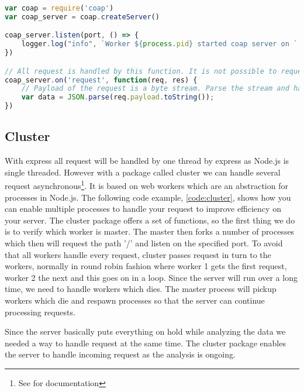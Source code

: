 \documentclass[USenglish]{ifimaster}  %
\begin{document}
\begin{lstlisting}[caption={Base \acrshort{coap} setup},label={code:coap},language=JavaScript]
var coap = require('coap')
var coap_server = coap.createServer()

coap_server.listen(port, () => {
    logger.log("info", `Worker ${process.pid} started coap server on ` + port);
})

// All request is handled by this function. It is not possible to request a specific url path
coap_server.on('request', function(req, res) {
    // Payload of the request is a byte stream. Parse the stream and handle the data
    var data = JSON.parse(req.payload.toString());
})
\end{lstlisting}

\subsection{Cluster}
With express all request will be handled by one thread by express as Node.js is single threaded. However with a package called cluster we can handle several request asynchronous\footnote{See \cite{npm:cluster} for documentation}. It is based on web workers which are an abstraction for processes in Node.js.
The following code example, \vref{code:cluster}, shows how you can enable multiple processes to handle your request to improve efficiency on your server. The cluster package offers a set of functions, so the first thing we do is to verify which worker is master. The master then forks a number of processes which then will request the path '/' and listen on the specified port. To avoid that all workers handle every request, cluster passes request in turn to the workers, normally in round robin fashion where worker 1 gets the first request, worker 2 the next and this goes on in a loop. Since the server will run over a long time, we need to handle workers which dies. The master process will pickup workers which die and respawn processes so that the server can continue processing requests.

Since the server basically puts everything on hold while analyzing the data we needed a way to handle request at the same time. The cluster package enables the server to handle incoming request as the analysis is ongoing.
\end{document}
